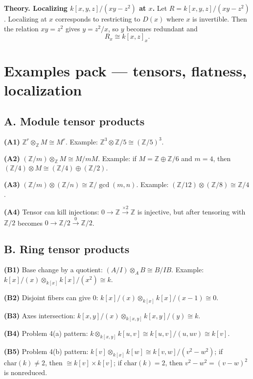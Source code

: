 \documentclass[12pt,a4paper]{article}
\theoremstyle{plain}
\theoremstyle{definition}      %
\begin{document}
	\medskip
	\textbf{Theory. Localizing \(k[x,y,z]/(xy-z^2)\) at \(x\).}
	Let \(R=k[x,y,z]/(xy-z^2)\). Localizing at \(x\) corresponds to restricting to \(D(x)\) where \(x\) is invertible.
	Then the relation \(xy=z^2\) gives \(y=z^2/x\), so \(y\) becomes redundant and
	\[
	R_x \cong k[x,z]_x.
	\]
	
	\section*{Examples pack — tensors, flatness, localization}
	
	\subsection*{A. Module tensor products}
	\textbf{(A1)} \(\mathbb Z^r\otimes_{\mathbb Z}M\cong M^r\). Example: \(\mathbb Z^3\otimes \mathbb Z/5\cong (\mathbb Z/5)^3\).
	
	\textbf{(A2)} \((\mathbb Z/m)\otimes_{\mathbb Z}M\cong M/mM\). Example:
	if \(M=\mathbb Z\oplus \mathbb Z/6\) and \(m=4\), then \((\mathbb Z/4)\otimes M\cong (\mathbb Z/4)\oplus (\mathbb Z/2)\).
	
	\textbf{(A3)} \((\mathbb Z/m)\otimes(\mathbb Z/n)\cong \mathbb Z/\gcd(m,n)\). Example: \((\mathbb Z/12)\otimes(\mathbb Z/8)\cong \mathbb Z/4\).
	
	\textbf{(A4)} Tensor can kill injections:
	\(0\to \mathbb Z\xrightarrow{\times 2}\mathbb Z\) is injective, but after tensoring with \(\mathbb Z/2\) becomes
	\(0\to \mathbb Z/2\xrightarrow{0}\mathbb Z/2\).
	
	\subsection*{B. Ring tensor products}
	\textbf{(B1)} Base change by a quotient: \((A/I)\otimes_A B\cong B/IB\).
	Example: \(k[x]/(x)\otimes_{k[x]} k[x]/(x^2)\cong k\).
	
	\textbf{(B2)} Disjoint fibers can give \(0\):
	\(k[x]/(x)\otimes_{k[x]}k[x]/(x-1)\cong 0\).
	
	\textbf{(B3)} Axes intersection:
	\(k[x,y]/(x)\otimes_{k[x,y]}k[x,y]/(y)\cong k\).
	
	\textbf{(B4)} Problem 4(a) pattern:
	\(k\otimes_{k[x,y]}k[u,v]\cong k[u,v]/(u,uv)\cong k[v]\).
	
	\textbf{(B5)} Problem 4(b) pattern:
	\(k[v]\otimes_{k[x]}k[w]\cong k[v,w]/(v^2-w^2)\);
	if \(\mathrm{char}(k)\neq 2\), then \(\cong k[v]\times k[v]\); if \(\mathrm{char}(k)=2\), then \(v^2-w^2=(v-w)^2\) is nonreduced.
	
\end{document}
